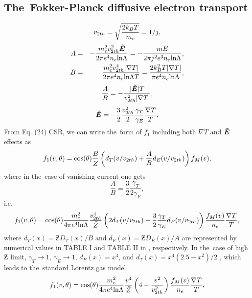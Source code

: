 \documentclass[preprint,12pt]{elsarticle}
\newcounter{bla}
\begin{document}
\subsection{The~Fokker-Planck diffusive electron transport}
\label{sec:FPDiffusiveRegime}
\begin{equation}
  v_{2 th} = \sqrt{\frac{2 k_B T}{m_e}} = 1 / j,
  \nonumber
\end{equation}
\begin{eqnarray}
  A &=& -\frac{m_e^2 v_{2 th}^2 \boldsymbol{\tilde{E}}}{2 \pi e^4 n_e \text{ln}\Lambda} = - \frac{m E}{2\pi j^2 e^3 n_e \text{ln}\Lambda}
  , \nonumber \\
  B &=& \frac{m_e^2 v_{2 th}^4 |\nabla T|}{2 \pi e^4 n_e \text{ln}\Lambda T} = \frac{2 k_B^2 T |\nabla T|}{\pi e^4 n_e \text{ln}\Lambda}
  , \nonumber
\end{eqnarray}
\begin{equation}
  \frac{A}{B} = - \frac{|\boldsymbol{\tilde{E}}| T}{v_{2 th}^2 |\nabla T|} ,
  \nonumber
\end{equation}
\begin{equation}
  \boldsymbol{\tilde{E}} = -\frac{3}{2}\frac{v_{2 th}^2}{2}\frac{\gamma_T}{\gamma_E}
  \frac{\nabla T}{T} ,
  \nonumber
\end{equation}
From Eq. (24) CSR, we can write the~form of $f_1$ including both $\nabla T$ 
and $\boldsymbol{\tilde{E}}$ effects as
\begin{equation}
  f_1(v, \theta) = \cos(\theta) \frac{B}{\bar{Z}}\left( d_T(v/v_{2 th}) 
  + \frac{A}{B} d_E(v/v_{2 th}) \right) f_M(v)  ,
  \nonumber
\end{equation}
where in the~case of vanishing current one gets
\begin{equation}
  \frac{A}{B} = \frac{3}{2}\frac{\gamma_T}{2 \gamma_E} ,
  \nonumber
\end{equation}
i.e.
\begin{equation}
  f_1(v, \theta) = \cos(\theta) \frac{m_e^2}{4 \pi e^4\text{ln}\Lambda} 
  \frac{v_{2 th}^4}{\bar{Z}}\left( 2 d_T(v/v_{2 th}) 
  + \frac{3}{2}\frac{\gamma_T}{\gamma_E} d_E(v/v_{2 th}) \right) 
  \frac{f_M(v)}{n_e}\frac{\nabla T}{T}  ,
  \label{eq:f1_SH}
\end{equation}
where $d_T(x) = \Zbar D_{T}(x) / B$ and $d_E(x) = \Zbar D_{E}(x) / A$ 
are represented by numerical values in TABLE I and TABLE II in 
\cite{SH_PR1953}, respectively. 
In the~case of high $\Zbar$ limit, $\gamma_T \rightarrow 1$,
$\gamma_E \rightarrow 1$, $d_E(x) = x^4$, and $d_T(x) = x^4 (2.5 - x^2)/2$
\cite{SH_PR1953}, which leads to the~standard Lorentz gas model
\begin{equation}
   f_1(v, \theta) = \cos(\theta) \frac{m_e^2}{4 \pi e^4\text{ln}\Lambda} 
  \frac{v^4}{\bar{Z}}\left( 4 - \frac{v^2}{v_{2 th}^2} \right) 
  \frac{f_M(v)}{n_e}\frac{\nabla T}{T}  ,
  \label{eq:f1_Lorentz} 
\end{equation}
\end{document}
